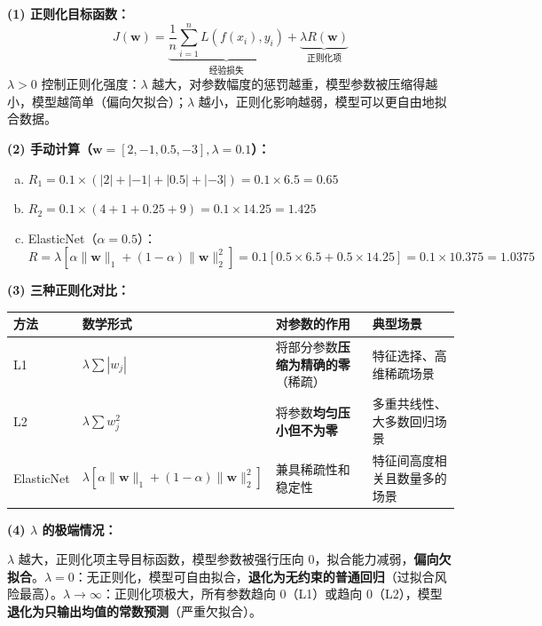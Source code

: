 \documentclass[a4paper,11pt]{ctexart}
\begin{document}
\begin{solutionbox}[参考答案与详细解析]
    \textbf{(1) 正则化目标函数：}
    \[
    J(\mathbf{w}) = \underbrace{\frac{1}{n}\sum_{i=1}^n L(f(x_i), y_i)}_{\text{经验损失}} + \underbrace{\lambda R(\mathbf{w})}_{\text{正则化项}}
    \]
    $\lambda > 0$ 控制正则化强度：$\lambda$ 越大，对参数幅度的惩罚越重，模型参数被压缩得越小，模型越简单（偏向欠拟合）；$\lambda$ 越小，正则化影响越弱，模型可以更自由地拟合数据。

    \textbf{(2) 手动计算（$\mathbf{w}=[2,-1,0.5,-3], \lambda=0.1$）：}
    \begin{enumerate}[a.]
        \item $R_1 = 0.1 \times (|2|+|-1|+|0.5|+|-3|) = 0.1 \times 6.5 = \mathbf{0.65}$
        \item $R_2 = 0.1 \times (4+1+0.25+9) = 0.1 \times 14.25 = \mathbf{1.425}$
        \item ElasticNet（$\alpha=0.5$）：$R = \lambda[\alpha\|\mathbf{w}\|_1 + (1-\alpha)\|\mathbf{w}\|_2^2] = 0.1[0.5\times6.5 + 0.5\times14.25] = 0.1\times10.375 = \mathbf{1.0375}$
    \end{enumerate}

    \textbf{(3) 三种正则化对比：}
    \begin{center}
    \begin{tabular}{p{2.5cm} p{3.5cm} p{3.5cm} p{3cm}}
        \toprule
        方法 & 数学形式 & 对参数的作用 & 典型场景 \\
        \midrule
        L1 & $\lambda\sum|w_j|$ & 将部分参数\textbf{压缩为精确的零}（稀疏） & 特征选择、高维稀疏场景 \\[0.8em]
        L2 & $\lambda\sum w_j^2$ & 将参数\textbf{均匀压小但不为零} & 多重共线性、大多数回归场景 \\[0.8em]
        ElasticNet & $\lambda[\alpha\|\mathbf{w}\|_1+(1-\alpha)\|\mathbf{w}\|_2^2]$ & 兼具稀疏性和稳定性 & 特征间高度相关且数量多的场景 \\
        \bottomrule
    \end{tabular}
    \end{center}

    \textbf{(4) $\lambda$ 的极端情况：}

    $\lambda$ 越大，正则化项主导目标函数，模型参数被强行压向 0，拟合能力减弱，\textbf{偏向欠拟合}。$\lambda=0$：无正则化，模型可自由拟合，\textbf{退化为无约束的普通回归}（过拟合风险最高）。$\lambda\to\infty$：正则化项极大，所有参数趋向 0（L1）或趋向 0（L2），模型\textbf{退化为只输出均值的常数预测}（严重欠拟合）。
\end{solutionbox}
\end{document}
